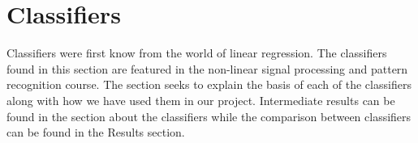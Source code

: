 \section{Classifiers}
Classifiers were first know from the world of linear regression. The classifiers found in this section are featured in the non-linear signal processing and pattern recognition course. The section seeks to explain the basis of each of the classifiers along with how we have used them in our project. Intermediate results can be found in the section about the classifiers while the comparison between classifiers can be found in the Results section.










\begingroup
	\raggedright
\endgroup



